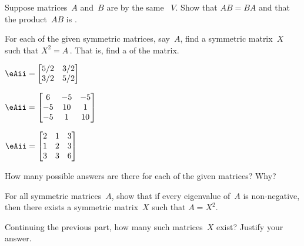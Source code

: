 \begin{exercise} \label{ex:} 
Suppose matrices~\(A\) and~\(B\) are  by the same ~\(V\).  
Show that \(AB=BA\) and that the product~\(AB\) is .
\end{exercise}




\begin{exercise} \label{ex:} 
For each of the given symmetric matrices, say~\(A\), find a symmetric matrix~\(X\) such that \(X^2=A\)\,.  
That is, find a  of the matrix.
\begin{parts}
\item \(\eAii=\begin{bmatrix} 5/2&3/2
\\3/2&5/2 \end{bmatrix}\)

\item \(\eAii=\begin{bmatrix} 6&-5&-5
\\-5&10&1
\\-5&1&10 \end{bmatrix}\)

\item \(\eAii=\begin{bmatrix} 2&1&3
\\1&2&3
\\3&3&6 \end{bmatrix}\)

\item How many possible answers are there for each of the given matrices?  Why?

\item For all symmetric matrices~\(A\), show that if every eigenvalue of~\(A\) is non-negative, then there exists a symmetric matrix~\(X\) such that \(A=X^2\).  

\item Continuing the previous part, how many such matrices~\(X\) exist?  Justify your answer.

\end{parts}
\end{exercise}
